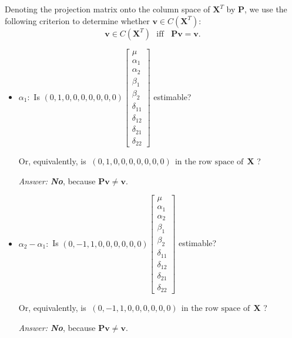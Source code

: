 \documentclass[paper=a4, fontsize=11pt]{scrartcl} %
\newcommand{\matP}{\mathbf{P}}
\newcommand{\matX}{\mathbf{X}}
\begin{document}
\begin{enumerate}[(a)]
Denoting the projection matrix onto the column space of $\matX^T$ by $\matP$, we use the following criterion to determine whether $\mathbf{v} \in C(\matX^T)$:
$$
\mathbf{v} \in C(\matX^T) \ \ \ \text{iff} \ \ \ \ \matP \mathbf{v} = \mathbf{v}.
$$

\bigskip

\begin{itemize}
\item $\alpha_1:$ 
Is $ (0, 1, 0, 0, 0, 0, 0, 0, 0)
\begin{bmatrix} 
\mu \\ \alpha_1\\ \alpha_2 \\ \beta_1 \\ \beta_2 \\ \delta_{11} \\ \delta_{12} \\ \delta_{21} \\ \delta_{22} 
\end{bmatrix}
$ estimable? 

\bigskip
Or, equivalently, is $\ (0, 1, 0, 0, 0, 0, 0, 0, 0) \ \ \text{in the row space of} \ \  \matX $ ?  

\bigskip
\begin{center}
\emph{Answer: \bf{No}}, because $\matP \mathbf{v} \neq \mathbf{v.}$
\end{center}
\bigskip
\bigskip

\item $\alpha_2 - \alpha_1:$ 
Is 
$
(0, -1, 1, 0, 0, 0, 0, 0, 0)
\begin{bmatrix} 
\mu \\ \alpha_1\\ \alpha_2 \\ \beta_1 \\ \beta_2 \\ \delta_{11} \\ \delta_{12} \\ \delta_{21} \\ \delta_{22} 
\end{bmatrix}
$ estimable? 

\bigskip
Or, equivalently, is $\ (0, -1, 1, 0, 0, 0, 0, 0, 0) \ \ \text{in the row space of} \ \  \matX $ ?  
\bigskip
\begin{center}
\emph{Answer: \bf{No}}, because $\matP \mathbf{v} \neq \mathbf{v.}$
\end{center}
\bigskip


\end{itemize}
\end{enumerate}
\end{document}
